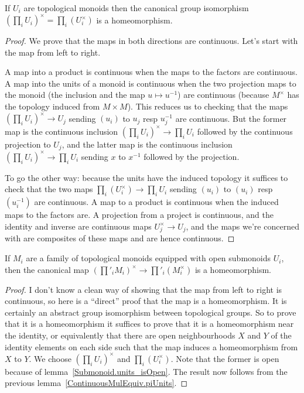 \begin{lemma}
  \label{ContinuousMulEquiv.piUnits}
  \leanok
  If $U_i$ are topological monoids then the canonical
  group isomorphism $(\prod_i U_i)^\times=\prod_i(U_i^\times)$ is a homeomorphism.
\end{lemma}
\begin{proof}
  \leanok
  We prove that the maps in both directions are continuous. Let's start
  with the map from left to right.

  A map into a product is continuous when the maps to the factors
  are continuous. A map into the units of a monoid is continuous when the
  two projection maps to the monoid (the inclusion and the map $u\mapsto u^{-1}$)
  are continuous (because $M^\times$ has the topology induced from $M\times M$).
  This reduces us to checking that the maps $(\prod_i U_i)^\times\to U_j$
  sending $(u_i)$ to $u_j$ resp $u_j^{-1}$ are continuous. But the former map
  is the continuous inclusion $(\prod_i U_i)^\times\to\prod_i U_i$ followed
  by the continuous projection to $U_j$, and the latter map is the continuous
  inclusion $(\prod_i U_i)^\times\to\prod_i U_i$ sending $x$ to $x^{-1}$
  followed by the projection.

  To go the other way: because the units have the induced topology it suffices
  to check that the two maps $\prod_i(U_i^\times)\to\prod_i U_i$
  sending $(u_i)$ to $(u_i)$ resp $(u_i^{-1})$ are continuous. A map
  to a product is continuous when the induced maps to the factors are.
  A projection from a project is continuous, and the identity and inverse are
  continuous maps $U_j^\times\to U_j$, and the maps we're concerned with are composites
  of these maps and are hence continuous.
\end{proof}

\begin{theorem}
  \label{ContinuousMulEquiv.restrictedProductUnits}
  \leanok
  If $M_i$ are a family of topological monoids equipped with open
  submonoids $U_i$, then the canonical map $(\prod'_iM_i)^\times\to\prod'_i(M_i^\times)$
  is a homeomorphism.
\end{theorem}
\begin{proof}
  \leanok
  I don't know a clean way of showing that the map from left to right is continuous,
  so here is a ``direct'' proof that the map is a homeomorphism. It is certainly an abstract group
  isomorphism between topological groups. So to prove that it is a homeomorphism it suffices
  to prove that it is a homeomorphism near the identity, or equivalently that there are open
  neighbourhoods $X$ and $Y$ of the identity elements on each side such that the map induces a
  homeomorphism from $X$ to $Y$. We choose $(\prod_i U_i)^\times$ and $\prod_i (U_i^\times)$.
  Note that the former is open because of lemma~\ref{Submonoid.units_isOpen}.
  The result now follows from the previous lemma~\ref{ContinuousMulEquiv.piUnits}.
\end{proof}

